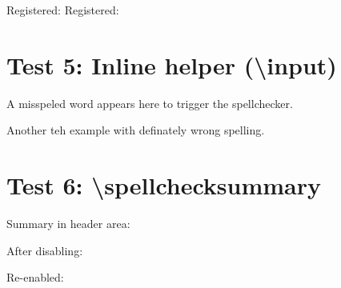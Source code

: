\documentclass{article}
\begin{document}
Registered: 
Registered: 

\newpage

\section*{Test 5: Inline helper (\textbackslash input)}

A misspeled word appears here to trigger the spellchecker.

Another teh example with definately wrong spelling.

\newpage

\section*{Test 6: \textbackslash spellchecksummary}

Summary in header area: 

After disabling: 
\swarmspellcheckfalse
{}

Re-enabled:
\swarmspellchecktrue
{}
\end{document}
